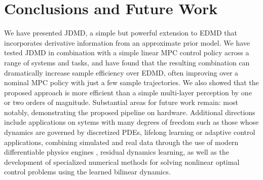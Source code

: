 \documentclass[../root.tex]{subfiles}
\newcommand{\changed}[1]{{\color{black} #1}}
\begin{document}
\section{Conclusions and Future Work} \label{sec:conclusion}

We have presented JDMD, a simple but powerful extension to EDMD that
incorporates derivative information from an approximate prior model. We have
tested JDMD in combination with a simple linear MPC control policy across a
range of systems and tasks, and have found that the resulting combination can
dramatically increase sample efficiency over EDMD, often improving over a
nominal MPC policy with just a few sample trajectories. \changed{We also showed
that the proposed approach is more efficient than a simple multi-layer
perception by one or two orders of magnitude.} Substantial areas for future work
remain: most notably, demonstrating the proposed pipeline on hardware.
Additional directions include \changed{applications on sytems with many degrees
of freedom such as those whose dynamics are governed by discretized PDEs},
lifelong learning or adaptive control applications, combining simulated and real
data through the use of modern differentiable physics engines
\cite{todorov_MuJoCo_2012,howell_Dojo_2022}, residual dynamics learning, as well
as the development of specialized numerical methods for solving nonlinear
optimal control problems using the learned bilinear dynamics.
\end{document}
